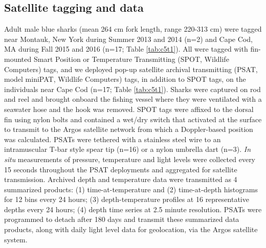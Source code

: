 \subsection{Satellite tagging and data} \label{sec:satdata}

Adult male blue sharks (mean 264 cm fork length, range 220-313 cm) were tagged near Montauk, New York during Summer 2013 and 2014 (n=2) and Cape Cod, MA during Fall 2015 and 2016 (n=17; Table \ref{tab:c5t1}). All were tagged with fin-mounted Smart Position or Temperature Transmitting (SPOT, Wildlife Computers) tags, and we deployed pop-up satellite archival transmitting (PSAT, model miniPAT, Wildlife Computers) tags, in addition to SPOT tags, on the individuals near Cape Cod (n=17; Table \ref{tab:c5t1}). Sharks were captured on rod and reel and brought onboard the fishing vessel where they were ventilated with a seawater hose and the hook was removed. SPOT tags were affixed to the dorsal fin using nylon bolts and contained a wet/dry switch that activated at the surface to transmit to the Argos satellite network from which a Doppler-based position was calculated. PSATs were tethered with a stainless steel wire to an intramuscular T-bar style spear tip (n=16) or a nylon umbrella dart (n=3). \textit{In situ} measurements of pressure, temperature and light levels were collected every 15 seconds throughout the PSAT deployments and aggregated for satellite transmission. Archived depth and temperature data were transmitted as 4 summarized products: (1) time-at-temperature and (2) time-at-depth histograms for 12 bins every 24 hours; (3) depth-temperature profiles at 16 representative depths every 24 hours; (4) depth time series at 2.5 minute resolution. PSATs were programmed to detach after 180 days and transmit these summarized data products, along with daily light level data for geolocation, via the Argos satellite system.

